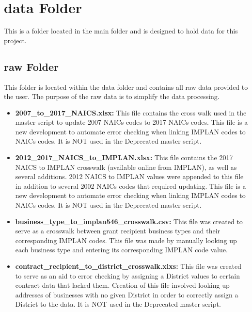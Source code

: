 \documentclass[
]{book}
\providecommand{\tightlist}{%
  \setlength{\itemsep}{0pt}\setlength{\parskip}{0pt}}
\begin{document}
\hypertarget{data-folder}{%
\section{data Folder}\label{data-folder}}

This is a folder located in the main folder and is designed to hold data for this project.

\hypertarget{raw-folder}{%
\subsection{raw Folder}\label{raw-folder}}

This folder is located within the data folder and contains all raw data provided to the user. The purpose of the raw data is to simplify the data processing.

\begin{itemize}
\tightlist
\item
  \textbf{2007\_to\_2017\_NAICS.xlsx:} This file contains the cross walk used in the master script to update 2007 NAICs codes to 2017 NAICs codes. This file is a new development to automate error checking when linking IMPLAN codes to NAICs codes. It is NOT used in the Deprecated master script.
\item
  \textbf{2012\_2017\_NAICS\_to\_IMPLAN.xlsx:} This file contains the 2017 NAICS to IMPLAN crosswalk (available online from IMPLAN), as well as several additions. 2012 NAICS to IMPLAN values were appended to this file in addition to several 2002 NAICs codes that required updating. This file is a new development to automate error checking when linking IMPLAN codes to NAICs codes. It is NOT used in the Deprecated master script.
\item
  \textbf{business\_type\_to\_implan546\_crosswalk.csv:} This file was created to serve as a crosswalk between grant recipient business types and their corresponding IMPLAN codes. This file was made by manually looking up each business type and entering its corresponding IMPLAN code value.
\item
  \textbf{contract\_recipient\_to\_district\_crosswalk.xlxs:} This file was created to serve as an aid to error checking by assigning a District values to certain contract data that lacked them. Creation of this file involved looking up addresses of businesses with no given District in order to correctly assign a District to the data. It is NOT used in the Deprecated master script.
\end{itemize}
\end{document}

